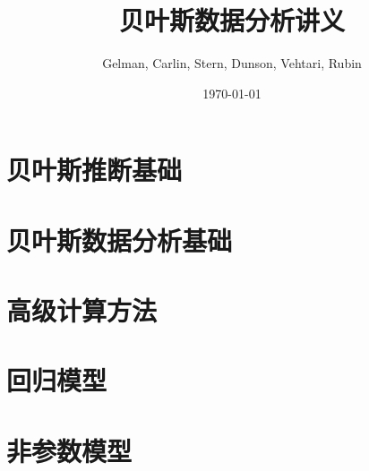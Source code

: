 \documentclass[12pt]{amsbook}
\title{贝叶斯数据分析讲义}
\author{Gelman, Carlin, Stern, Dunson, Vehtari, Rubin}
\date{\today}
\theoremstyle{definition}
\begin{document}

\maketitle
\tableofcontents

\part{贝叶斯推断基础}







\part{贝叶斯数据分析基础}






\part{高级计算方法}






\part{回归模型}







\part{非参数模型}







\appendix

\end{document}
